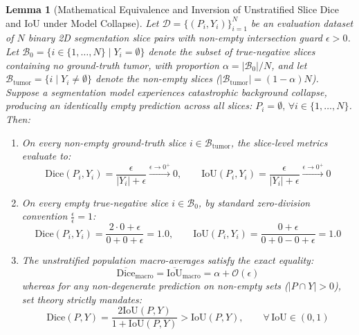 \documentclass{article}
\newtheorem{lemma}{Lemma}
\begin{document}
\begin{lemma}[Mathematical Equivalence and Inversion of Unstratified Slice Dice and IoU under Model Collapse]
\label{lem:dice_iou_collapse}
Let $\mathcal{D} = \{(P_i, Y_i)\}_{i=1}^N$ be an evaluation dataset of $N$ binary 2D segmentation slice pairs with non-empty intersection guard $\epsilon > 0$. Let $\mathcal{B}_0 = \{i \in \{1, \dots, N\} \mid Y_i = \emptyset\}$ denote the subset of true-negative slices containing no ground-truth tumor, with proportion $\alpha = |\mathcal{B}_0| / N$, and let $\mathcal{B}_{\text{tumor}} = \{i \mid Y_i \neq \emptyset\}$ denote the non-empty slices ($|\mathcal{B}_{\text{tumor}}| = (1 - \alpha) N$).
Suppose a segmentation model experiences catastrophic background collapse, producing an identically empty prediction across all slices: $P_i = \emptyset, \, \forall i \in \{1, \dots, N\}$.
Then:
\begin{enumerate}
    \item On every non-empty ground-truth slice $i \in \mathcal{B}_{\text{tumor}}$, the slice-level metrics evaluate to:
    \begin{equation}
        \text{Dice}(P_i, Y_i) = \frac{\epsilon}{|Y_i| + \epsilon} \xrightarrow{\epsilon \to 0^+} 0, \qquad \text{IoU}(P_i, Y_i) = \frac{\epsilon}{|Y_i| + \epsilon} \xrightarrow{\epsilon \to 0^+} 0
    \end{equation}
    \item On every empty true-negative slice $i \in \mathcal{B}_0$, by standard zero-division convention $\frac{\epsilon}{\epsilon} = 1$:
    \begin{equation}
        \text{Dice}(P_i, Y_i) = \frac{2 \cdot 0 + \epsilon}{0 + 0 + \epsilon} = 1.0, \qquad \text{IoU}(P_i, Y_i) = \frac{0 + \epsilon}{0 + 0 - 0 + \epsilon} = 1.0
    \end{equation}
    \item The unstratified population macro-averages satisfy the exact equality:
    \begin{equation}
        \overline{\text{Dice}}_{\text{macro}} = \overline{\text{IoU}}_{\text{macro}} = \alpha + \mathcal{O}(\epsilon)
    \end{equation}
    whereas for any non-degenerate prediction on non-empty sets ($|P \cap Y| > 0$), set theory strictly mandates:
    \begin{equation}
        \text{Dice}(P, Y) = \frac{2 \text{IoU}(P, Y)}{1 + \text{IoU}(P, Y)} > \text{IoU}(P, Y), \qquad \forall \, \text{IoU} \in (0, 1)
    \end{equation}
\end{enumerate}
\end{lemma}
\end{document}
